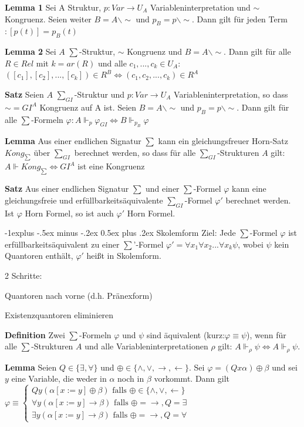 \documentclass[a4paper]{article}
\makeatletter
\renewcommand{\note}[2]{\begin{noteBox} \textbf{#1} #2 \end{noteBox}}
\renewcommand{\subsection}{\@startsection{subsection}{2}{0mm}%
                {-1explus -.5ex minus -.2ex}%
                {0.5ex plus .2ex}%
                {\normalfont\normalsize\bfseries}}
\makeatother
\begin{document}
\begin{multicols}{3}
  \note{Lemma 1}{Sei A Struktur, $p:Var\rightarrow U_A$ Variableninterpretation und $\sim$ Kongruenz. Seien weiter $B=A\backslash\sim$ und $p_B=p\backslash\sim$. Dann gilt für jeden Term $:[p(t)]=p_B(t)$}

  \note{Lemma 2}{Sei $A$ $\sum$-Struktur, $\sim$ Kongruenz und $B=A\backslash\sim$. Dann gilt für alle $R\in Rel$ mit $k=ar(R)$ und alle $c_1,...,c_k\in U_A$: $([c_1],[c_2],...,[c_k])\in R^B\Leftrightarrow (c_1,c_2,...,c_k)\in R^A$}

  \note{Satz}{Seien $A$ $\sum_{GI}$-Struktur und $p:Var\rightarrow U_A$ Variableninterpretation, so dass $\sim=GI^A$ Kongruenz auf A ist.
    Seien $B=A\backslash\sim$ und $p_B=p\backslash\sim$.
    Dann gilt für alle $\sum$-Formeln $\varphi: A\Vdash_p \varphi_{GI} \Leftrightarrow B\Vdash_{p_B} \varphi$
  }

  \note{Lemma}{Aus einer endlichen Signatur $\sum$ kann ein gleichungsfreuer Horn-Satz $Kong_{\sum}$ über $\sum_{GI}$ berechnet werden, so dass für alle $\sum_{GI}$-Strukturen $A$ gilt: $A\Vdash Kong_{\sum} \Leftrightarrow GI^A$ ist eine Kongruenz}

  \note{Satz}{Aus einer endlichen Signatur $\sum$ und einer $\sum$-Formel $\varphi$ kann eine gleichungsfreie und erfüllbarkeitsäquivalente $\sum_{GI}$-Formel $\varphi'$ berechnet werden. Ist $\varphi$ Horn Formel, so ist auch $\varphi'$ Horn Formel.}

  \subsection{Skolemform}
  Ziel: Jede $\sum$-Formel $\varphi$ ist erfüllbarkeitsäquivalent zu einer $\sum$'-Formel $\varphi'=\forall x_1\forall x_2 ...\forall x_k \psi$, wobei $\psi$ kein Quantoren enthält, $\varphi'$ heißt in Skolemform.

  2 Schritte:
  \begin{enumerate*}
    \item Quantoren nach vorne (d.h. Pränexform)
    \item Existenzquantoren eliminieren
  \end{enumerate*}

  \note{Definition}{Zwei $\sum$-Formeln $\varphi$ und $\psi$ sind äquivalent (kurz:$\varphi\equiv\psi$), wenn für alle $\sum$-Strukturen $A$ und alle Variableninterpretationen $\rho$ gilt: $A\Vdash_{\rho}\psi\Leftrightarrow A\Vdash_{\rho}\psi$.}

  \note{Lemma}{Seien $Q\in\{\exists ,\forall\}$ und $\oplus\in\{\wedge,\vee,\rightarrow,\leftarrow\}$. Sei $\varphi= (Qx \alpha)\oplus\beta$ und sei $y$ eine Variable, die weder in $\alpha$ noch in $\beta$ vorkommt. Dann gilt $\varphi \equiv \begin{cases} Qy(\alpha[x:=y]\oplus\beta) \text{ falls } \oplus\in\{\wedge,\vee,\leftarrow\}\\ \forall y(\alpha[x:=y]\rightarrow\beta) \text{ falls } \oplus=\rightarrow,Q=\exists \\ \exists y(\alpha[x:=y]\rightarrow\beta) \text{ falls }\oplus=\rightarrow,Q=\forall\end{cases}$}


\end{multicols}
\end{document}
